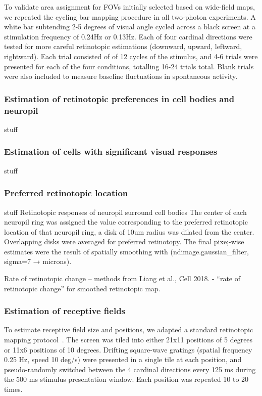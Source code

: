 To validate area assignment for FOVs initially selected based on wide-field maps, we repeated the cycling bar mapping procedure in all two-photon experiments. A white bar subtending 2-5 degrees of visual angle cycled across a black screen at a stimulation frequency of 0.24Hz or 0.13Hz. Each of four cardinal directions were tested for more careful retinotopic estimations (downward, upward, leftward, rightward). Each trial consisted of of 12 cycles of the stimulus, and 4-6 trials were presented for each of the four conditions, totalling 16-24 trials total. Blank trials were also included to measure baseline fluctuations in spontaneous activity.  




\subsubsection{Estimation of retinotopic preferences in cell bodies and neuropil}
stuff
\subsubsection{Estimation of cells with significant visual responses}
stuff

\subsubsection{Preferred retinotopic location}
stuff
Retinotopic responses of neuropil surround cell bodies
The center of each neuropil ring was assigned the value corresponding to the preferred retinotopic location of that neuropil ring, a disk of 10um radius was dilated from the center. Overlapping disks were averaged for preferred retinotopy. The final pixe;-wise estimates were the result of spatially smoothing with (ndimage.gaussian_filter, sigma=7 → microns). 

Rate of retinotopic change -- methods from Liang et al., Cell 2018. - “rate of retinotopic change” for smoothed retinotopic map.

\subsubsection{Estimation of receptive fields}
To estimate receptive field size and positions, we adapted a standard retinotopic mapping protocol~\cite{Marques2018}. The screen was tiled into either 21x11 positions of 5 degrees or 11x6 positions of 10 degrees. Drifting square-wave gratings (spatial frequency 0.25 Hz, speed 10 deg/s) were presented in a single tile at each position, and pseudo-randomly switched between the 4 cardinal directions every 125 ms during the 500 ms stimulus presentation window. Each position was repeated 10 to 20 times. 

